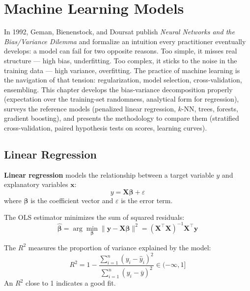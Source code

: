 \chapter{Machine Learning Models}
\label{ch:modeles}

In 1992, Geman, Bienenstock, and Doursat publish \emph{Neural Networks and the Bias/Variance Dilemma} and formalize an intuition every practitioner eventually develops: a model can fail for two opposite reasons. Too simple, it misses real structure --- high bias, underfitting. Too complex, it sticks to the noise in the training data --- high variance, overfitting. The practice of machine learning is the navigation of that tension: regularization, model selection, cross-validation, ensembling. This chapter develops the bias-variance decomposition properly (expectation over the training-set randomness, analytical form for regression), surveys the reference models (penalized linear regression, $k$-NN, trees, forests, gradient boosting), and presents the methodology to compare them (stratified cross-validation, paired hypothesis tests on scores, learning curves).

\section{Linear Regression}
\label{sec:regression_lineaire}


\begin{definition}
\textbf{Linear regression} models the relationship between a target variable $y$ and explanatory variables $\mathbf{x}$:
\[
y = \mathbf{X}\boldsymbol{\beta} + \varepsilon
\]
where $\boldsymbol{\beta}$ is the coefficient vector and $\varepsilon$ is the error term.
\end{definition}

\begin{theorem}
The OLS estimator minimizes the sum of squared residuals:
\[
\hat{\boldsymbol{\beta}} = \arg\min_{\boldsymbol{\beta}} \| \mathbf{y} - \mathbf{X}\boldsymbol{\beta} \|^2 = (\mathbf{X}^\top \mathbf{X})^{-1}\mathbf{X}^\top \mathbf{y}
\]
\end{theorem}

\begin{definition}
The $R^2$ measures the proportion of variance explained by the model:
\[
R^2 = 1 - \frac{\sum_{i=1}^{n}(y_i - \hat{y}_i)^2}{\sum_{i=1}^{n}(y_i - \bar{y})^2} \in (-\infty, 1]
\]
An $R^2$ close to 1 indicates a good fit.
\end{definition}

